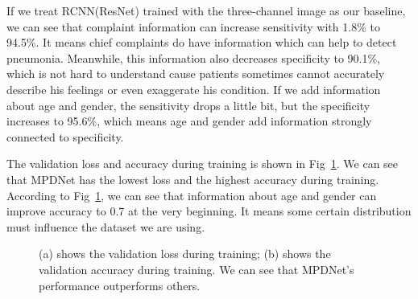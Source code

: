 \documentclass[journal]{IEEEtran}
\begin{document}
If we treat RCNN(ResNet) trained with the three-channel image as our baseline, we can see that complaint information can increase sensitivity with 1.8\% to 94.5\%. It means chief complaints do have information which can help to detect pneumonia. Meanwhile, this information also decreases specificity to 90.1\%, which is not hard to understand cause patients sometimes cannot accurately describe his feelings or even exaggerate his condition. If we add information about age and gender, the sensitivity drops a little bit, but the specificity increases to 95.6\%, which means age and gender add information strongly connected to specificity.

The validation loss and accuracy during training is shown in Fig~\ref{loss}. We can see that MPDNet has the lowest loss and the highest accuracy during training.
According to Fig~\ref{loss}, we can see that information about age and gender can improve accuracy to 0.7 at the very beginning. It means some certain distribution must influence the dataset we are using. 
\begin{figure}[htbp]
    \centering
    \centering
    \caption{(a) shows the validation loss during training; (b) shows the validation accuracy during training. We can see that MPDNet's performance outperforms others.
    }
    \label{loss}

    \end{figure}
\end{document}
